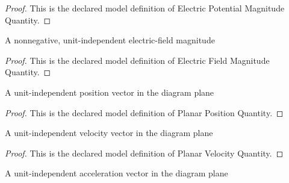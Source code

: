 \begin{proof}
  This is the declared model definition of Electric Potential Magnitude Quantity.
\end{proof}
\begin{definition}
  \label{def:physics:phyx-mini-0993:phyxminiproblems-problemphyxmini0993-electricfieldmagnitudequantity}
  A nonnegative, unit-independent electric-field magnitude
\end{definition}
\begin{proof}
  This is the declared model definition of Electric Field Magnitude Quantity.
\end{proof}
\begin{definition}
  \label{def:physics:phyx-mini-0993:phyxminiproblems-problemphyxmini0993-planarpositionquantity}
  A unit-independent position vector in the diagram plane
\end{definition}
\begin{proof}
  This is the declared model definition of Planar Position Quantity.
\end{proof}
\begin{definition}
  \label{def:physics:phyx-mini-0993:phyxminiproblems-problemphyxmini0993-planarvelocityquantity}
  A unit-independent velocity vector in the diagram plane
\end{definition}
\begin{proof}
  This is the declared model definition of Planar Velocity Quantity.
\end{proof}
\begin{definition}
  \label{def:physics:phyx-mini-0993:phyxminiproblems-problemphyxmini0993-planaraccelerationquantity}
  A unit-independent acceleration vector in the diagram plane
\end{definition}
